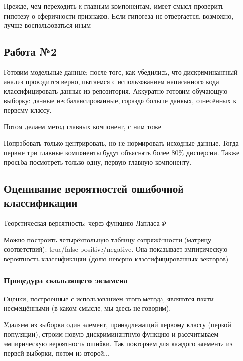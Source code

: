 \documentclass[main.tex]{subfiles}
\begin{document}
Прежде, чем переходить к главным компонентам, имеет смысл проверить гипотезу о сферичности признаков.
Если гипотеза не отвергается, возможно, лучше воспользоваться иным 

\subsection{Работа №2}

Готовим модельные данные; после того, как убедились, что дискриминантный анализ проводится верно, пытаемся с использованием написанного кода классифицировать данные из репозитория.
Аккуратно готовим обучающую выборку: данные несбалансированные, гораздо больше данных, отнесённых к первому классу.

Потом делаем метод главных компонент, с ним тоже

Попробовать только центрировать, но не нормировать исходные данные. 
Тогда первые три главные компоненты будут объяснять более $ 80\% $ дисперсии.
Также просьба посмотреть только одну, первую главную компоненту. 

\subsection{Оценивание вероятностей ошибочной классификации}

Теоретическая вероятность: через функцию Лапласа $ \Phi $

Можно построить четырёхпольную таблицу сопряжённости (матрицу соответствий): true/false positive/negative.
Она показывает эмпирическую вероятность классификации (долю неверно классифицированных векторов).

\subsubsection{Процедура скользящего экзамена}

Оценки, построенные с использованием этого метода, являются почти несмещёнными (в каком смысле, мы здесь не говорим).

Удаляем из выборки один элемент, принадлежащий первому классу (первой популяции), строим новую дискриминантную функцию и рассчитываем эмпирическую вероятность ошибки.
Так повторяем для каждого элемента из первой выборки, потом из второй... %
\end{document}
